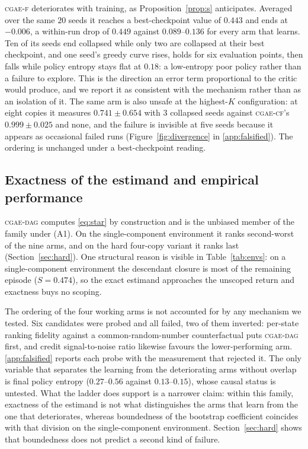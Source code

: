 \documentclass[review,authoryear,3p,times]{elsarticle}
\newcommand{\cflow}{\textsc{cgae-cf}}          %
\newcommand{\cflowraw}{\textsc{cgae-f}}        %
\newcommand{\cdag}{\textsc{cgae-dag}}          %
\begin{document}
\cflowraw{} deteriorates with training, as Proposition~\ref{prop:s}
anticipates. Averaged over the same $20$ seeds it reaches a best-checkpoint
value of $0.443$ and ends at $-0.006$, a within-run drop of $0.449$ against
$0.089$--$0.136$ for every arm that learns. Ten of its seeds end collapsed
while only two are collapsed at their best checkpoint, and one seed's greedy
curve rises, holds for six evaluation points, then falls while policy entropy
stays flat at $0.18$: a low-entropy poor policy rather than a failure to
explore. This is the direction an error term proportional to the critic would
produce, and we report it as consistent with the mechanism rather than as an
isolation of it. The same arm is also unsafe at the highest-$K$
configuration: at eight copies it measures $0.741\pm0.654$ with $3$ collapsed
seeds against \cflow's $0.999\pm0.025$ and none, and the failure is invisible
at five seeds because it appears as occasional failed runs
(Figure~\ref{fig:divergence} in \ref{app:falsified}). The ordering is
unchanged under a best-checkpoint reading.

\subsection{Exactness of the estimand and empirical performance}
\label{sec:exactness}

\cdag{} computes \eqref{eq:star} by construction and is the unbiased member of
the family under (A1). On the single-component environment it ranks
second-worst of the nine arms, and on the hard four-copy variant it ranks last
(Section~\ref{sec:hard}). One structural reason is visible in
Table~\ref{tab:envs}: on a single-component environment the descendant closure
is most of the remaining episode ($S=0.474$), so the exact estimand approaches
the unscoped return and exactness buys no scoping.

The ordering of the four working arms is not accounted for by any mechanism we
tested. Six candidates were probed and all failed, two of them inverted:
per-state ranking fidelity against a common-random-number counterfactual puts
\cdag{} first, and credit signal-to-noise ratio likewise favours the
lower-performing arm. \ref{app:falsified} reports each probe with the
measurement that rejected it. The only variable that separates the learning
from the deteriorating arms without overlap is final policy entropy
($0.27$--$0.56$ against $0.13$--$0.15$), whose causal status is untested. What
the ladder does support is a narrower claim: within this family, exactness of
the estimand is not what distinguishes the arms that learn from the one that
deteriorates, whereas boundedness of the bootstrap coefficient coincides with
that division on the single-component environment. Section~\ref{sec:hard}
shows that boundedness does not predict a second kind of failure.
\end{document}
